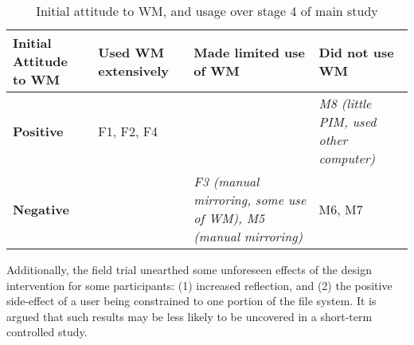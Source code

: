 \begin{table} %
\begin{center}
\begin{footnotesize}
\setlength{\extrarowheight}{2pt}
\begin{tabular}{|p{2.5cm}|p{2.5cm}|p{2.5cm}|p{2.5cm}|}
\hline
{\bf Initial Attitude to WM} & {\bf Used WM extensively} & {\bf Made limited use of WM} & {\bf Did not use WM} \\
\hline
{\bf Positive} & F1, F2, F4 &            & \textit{M8 (little PIM, used other computer)} \\
\hline
{\bf Negative} &            & \textit{F3 (manual mirroring, some use of WM), M5 (manual mirroring)} &     M6, M7 \\
\hline
\end{tabular}  
\end{footnotesize}
\caption{Initial attitude to WM, and usage over stage 4 of main study}
\label{table:main-study:wm-attitude-usage}
\end{center}
\end{table}
\normalsize



Additionally, the field trial unearthed some unforeseen effects of the design intervention for some participants: (1) increased reflection, and (2) the positive side-effect of a user being constrained to one portion of the file system.  It is argued that such results may be less likely to be uncovered in a short-term controlled study.




